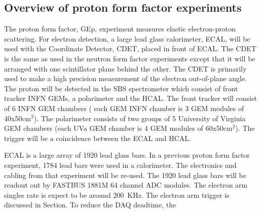 \documentclass{article}
\begin{document}
\subsection{Overview of proton form factor experiments}
The proton form factor, GEp, experiment measures elastic electron-proton scattering. For electron
detection, a large lead glass calorimeter, ECAL,  will be used with the Coordinate Detector, CDET, placed in front
of ECAL. The CDET is the same as used in the neutron form factor experiments except
that it will be arranged with one scintillator plane behind the other. The CDET is primarily used
to make a high precision measurement of the electron out-of-plane angle. The proton will be
detected in the SBS spectrometer which consist of front tracker INFN GEMs, a polarimeter and the HCAL.
The front tracker will consist of 6 INFN GEM chambers ( each GEM INFN chamber is 3 GEM modules of 40x50cm$^2$).
The polarimeter consists of two groups of 5 University of Virginia GEM chambers (each UVa GEM chamber
is 4 GEM modules of 60x50cm$^2$). The trigger will be a coincidence between the ECAL and HCAL.

ECAL is a large array of 1920 lead glass bars. In a previous proton form factor experiment, 1784 lead bars
were used in a calorimeter. The electronics and cabling from that experiment will be re-used. The 1920
lead glass bars will be readout out by  FASTBUS 1881M 64 channel ADC modules. The electron arm
singles rate is expect to be around 200~KHz. The electron arm trigger is discussed in Section. To reduce
the DAQ deadtime, the 
\end{document}
